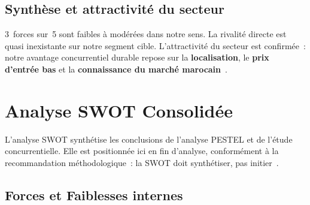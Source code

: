 \documentclass[12pt, a4paper]{report}
\begin{document}
\subsection{Synthèse et attractivité du secteur}

\begin{tcolorbox}[successbox,title={Conclusion de l'analyse de Porter}]
3~forces sur~5 sont faibles à modérées dans notre sens. La rivalité directe est
quasi inexistante sur notre segment cible. L'attractivité du secteur est confirmée~:
notre avantage concurrentiel durable repose sur la \textbf{localisation},
le \textbf{prix d'entrée bas} et la \textbf{connaissance du marché
marocain}~\cite{tp3_faisabilite}.
\end{tcolorbox}

\section{Analyse SWOT Consolidée}

L'analyse SWOT synthétise les conclusions de l'analyse PESTEL et de l'étude
concurrentielle. Elle est positionnée ici en fin d'analyse, conformément à la
recommandation méthodologique~: la SWOT doit synthétiser, pas initier~\cite{guide_pfa}.

\subsection{Forces et Faiblesses internes}
\end{document}
